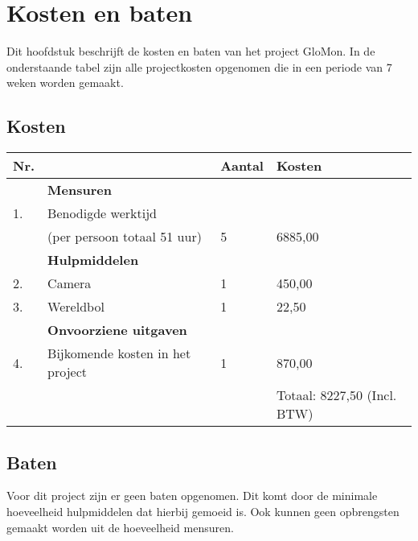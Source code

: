 \chapter{Kosten en baten} \label{cha:kostenenbaten}

Dit hoofdstuk beschrijft de kosten en baten van het project GloMon. In de onderstaande tabel zijn alle projectkosten opgenomen die in een periode van 7 weken worden gemaakt.

\section{Kosten} \label{subsec:kosten}

\begin{tabular}{ | l | l | l | l | }
	\hline
    Nr. &    & Aantal & Kosten \\ \hline
    	& \textbf{Mensuren} & & \\
    1.	& Benodigde werktijd & & \\
    	& (per persoon totaal 51 uur) & 5 & 6885,00 \\ \hline
    	& \textbf{Hulpmiddelen} & & \\
    2.	& Camera & 1 & 450,00 \\
    3.	& Wereldbol & 1 & 22,50 \\ \hline
     	& \textbf{Onvoorziene uitgaven} & & \\
    4.  & Bijkomende kosten in het project & 1 & 870,00 \\ \hline
    	&	& 	& Totaal: 8227,50 (Incl. BTW) \\ \hline
\end{tabular}

\section{Baten} \label{subsec:baten}

Voor dit project zijn er geen baten opgenomen. Dit komt door de minimale hoeveelheid hulpmiddelen dat hierbij gemoeid is. Ook kunnen geen opbrengsten gemaakt worden uit de hoeveelheid mensuren.